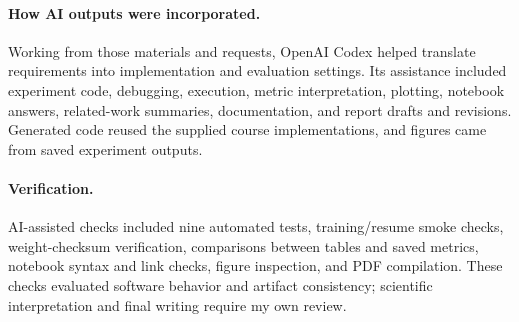 \documentclass[11pt]{article}
\begin{document}
\paragraph{How AI outputs were incorporated.}
Working from those materials and requests, OpenAI Codex helped translate requirements into implementation and evaluation settings. Its assistance included experiment code, debugging, execution, metric interpretation, plotting, notebook answers, related-work summaries, documentation, and report drafts and revisions. Generated code reused the supplied course implementations, and figures came from saved experiment outputs.

\paragraph{Verification.}
AI-assisted checks included nine automated tests, training/resume smoke checks, weight-checksum verification, comparisons between tables and saved metrics, notebook syntax and link checks, figure inspection, and PDF compilation. These checks evaluated software behavior and artifact consistency; scientific interpretation and final writing require my own review.
\end{document}
